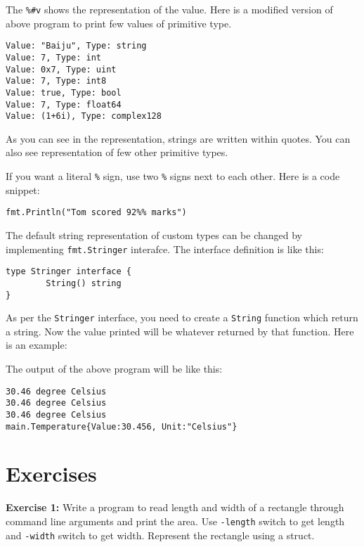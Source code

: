 The \texttt{\%\#v} shows the representation of the value. Here is a
modified version of above program to print few values of primitive
type.



\begin{lstlisting}[numbers=none]
Value: "Baiju", Type: string
Value: 7, Type: int
Value: 0x7, Type: uint
Value: 7, Type: int8
Value: true, Type: bool
Value: 7, Type: float64
Value: (1+6i), Type: complex128
\end{lstlisting}

As you can see in the representation, strings are written within
quotes.  You can also see representation of few other primitive types.

If you want a literal \texttt{\%} sign, use two \texttt{\%} signs next
to each other.  Here is a code snippet:

\begin{lstlisting}[numbers=none]
        fmt.Println("Tom scored 92%% marks")
\end{lstlisting}

The default string representation of custom types can be changed by
implementing \texttt{fmt.Stringer} interafce.  The interface
definition is like this:

\begin{lstlisting}[numbers=none]
type Stringer interface {
        String() string
}
\end{lstlisting}

As per the \texttt{Stringer} interface, you need to create
a \texttt{String} function which return a string.  Now the value
printed will be whatever returned by that function.  Here is an
example:



The output of the above program will be like this:

\begin{lstlisting}[numbers=none]
30.46 degree Celsius
30.46 degree Celsius
30.46 degree Celsius
main.Temperature{Value:30.456, Unit:"Celsius"}
\end{lstlisting}

\section{Exercises}

{\bfseries Exercise 1:} Write a program to read length and width of a
rectangle through command line arguments and print the area.
Use \texttt{-length} switch to get length and \texttt{-width} switch
to get width.  Represent the rectangle using a struct.

